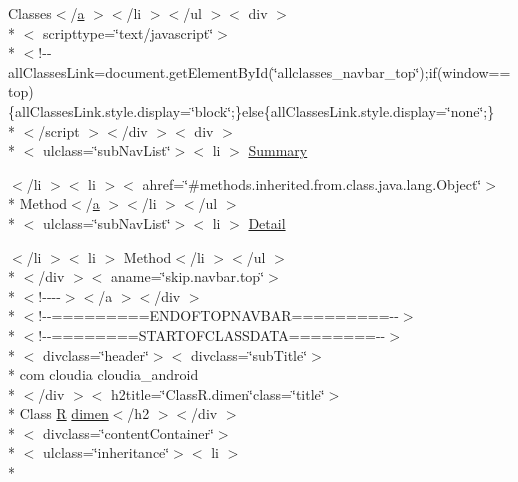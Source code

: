 \begin{DoxyCompactItemize}
\item 
Classes$<$/\hyperlink{style_8css_a5e8981582017bb8b84c21f148345d1f7}{a} $>$$<$/li $>$$<$/ul $>$$<$ div $>$\\*
$<$ scripttype=\char`\"{}text/javascript\char`\"{}$>$\\*
$<$!-\/-\/all\-Classes\-Link=document.\-get\-Element\-By\-Id(\char`\"{}allclasses\-\_\-navbar\-\_\-top\char`\"{});if(window==top)\{all\-Classes\-Link.\-style.\-display=\char`\"{}block\char`\"{};\}else\{all\-Classes\-Link.\-style.\-display=\char`\"{}none\char`\"{};\}\\*
$<$/script $>$$<$/div $>$$<$ div $>$\\*
$<$ ulclass=\char`\"{}sub\-Nav\-List\char`\"{}$>$$<$ li $>$ \hyperlink{_r_8dimen_8html_a6f9ab45abc9b0679dc1b132fbacfc681}{Summary}
\item 
$<$/li $>$$<$ li $>$$<$ ahref=\char`\"{}\#methods.\-inherited.\-from.\-class.\-java.\-lang.\-Object\char`\"{}$>$\\*
 Method$<$/\hyperlink{style_8css_a5e8981582017bb8b84c21f148345d1f7}{a} $>$$<$/li $>$$<$/ul $>$\\*
$<$ ulclass=\char`\"{}sub\-Nav\-List\char`\"{}$>$$<$ li $>$ \hyperlink{_r_8dimen_8html_aed0df2ae11502bf9389ac3cf53b1c0f6}{Detail}
\item 
$<$/li $>$$<$ li $>$ Method$<$/li $>$$<$/ul $>$\\*
$<$/div $>$$<$ aname=\char`\"{}skip.\-navbar.\-top\char`\"{}$>$\\*
$<$!-\/-\/-\/-\/$>$$<$/a $>$$<$/div $>$\\*
$<$!-\/-\/=========E\-N\-D\-O\-F\-T\-O\-P\-N\-A\-V\-B\-A\-R=========-\/-\/$>$\\*
$<$!-\/-\/========S\-T\-A\-R\-T\-O\-F\-C\-L\-A\-S\-S\-D\-A\-T\-A========-\/-\/$>$\\*
$<$ divclass=\char`\"{}header\char`\"{}$>$$<$ divclass=\char`\"{}sub\-Title\char`\"{}$>$\\*
 com cloudia cloudia\-\_\-android\\*
$<$/div $>$$<$ h2title=\char`\"{}Class\-R.\-dimen\char`\"{}class=\char`\"{}title\char`\"{}$>$\\*
 Class \hyperlink{index-16_8html_a31e8fe59be5c20ce90a0090e28a0c1fe}{R} \hyperlink{index-4_8html_a788baa6fefe82077db8777df522abe04}{dimen}$<$/h2 $>$$<$/div $>$\\*
$<$ divclass=\char`\"{}content\-Container\char`\"{}$>$\\*
$<$ ulclass=\char`\"{}inheritance\char`\"{}$>$$<$ li $>$\\*

\end{DoxyCompactItemize}
